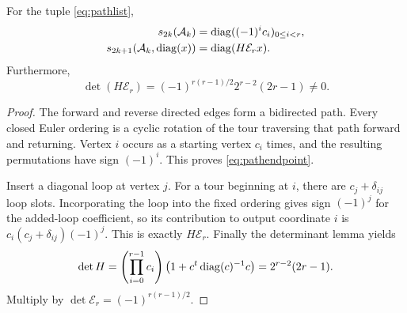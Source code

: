 \begin{lemma}\label{lem:pathloop}
For the tuple \eqref{eq:pathlist},
\begin{align}
 s_{2k}(\mathcal A_k)&=\operatorname{diag}((-1)^ic_i)_{0\le i<r},\label{eq:pathendpoint}\\
 s_{2k+1}(\mathcal A_k,\operatorname{diag}(x))&=\operatorname{diag}(H\mathcal E_r x).
 \label{eq:pathdiag}
\end{align}
Furthermore,
\begin{equation}\label{eq:pathdet}
 \det(H\mathcal E_r)=(-1)^{r(r-1)/2}2^{r-2}(2r-1)\ne0.
\end{equation}
\end{lemma}
\begin{proof}
The forward and reverse directed edges form a bidirected path. Every
closed Euler ordering is a cyclic rotation of the tour traversing
that path forward and returning. Vertex $i$ occurs as a starting
vertex $c_i$ times, and the resulting permutations have sign
$(-1)^i$. This proves \eqref{eq:pathendpoint}.

Insert a diagonal loop at vertex $j$. For a tour beginning at $i$,
there are $c_j+\delta_{ij}$ loop slots. Incorporating the loop into
the fixed ordering gives sign $(-1)^j$ for the added-loop
coefficient, so its contribution to output coordinate $i$ is
$c_i(c_j+\delta_{ij})(-1)^j$. This is exactly
$H\mathcal E_r$. Finally the determinant lemma yields
\[
 \det H=\left(\prod_{i=0}^{r-1}c_i\right)
 \left(1+c^t\operatorname{diag}(c)^{-1}c\right)
 =2^{r-2}(2r-1).
\]
Multiply by $\det\mathcal E_r=(-1)^{r(r-1)/2}$.
\end{proof}

